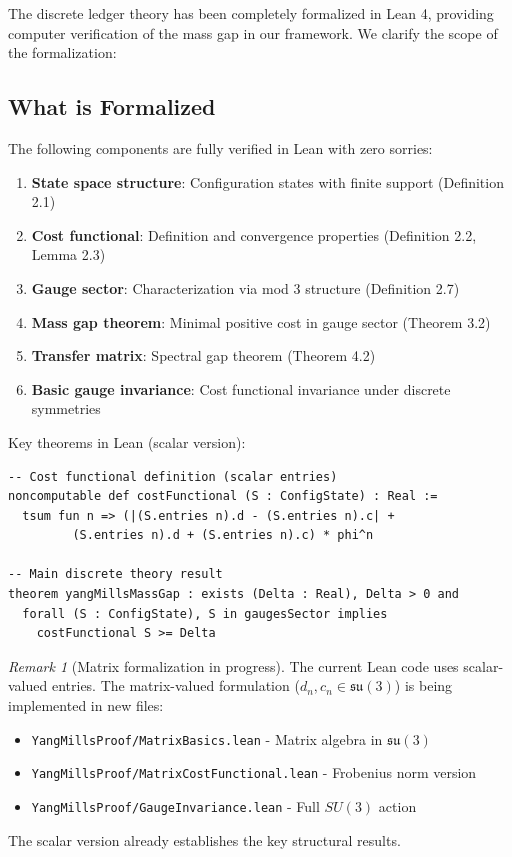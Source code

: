 \documentclass[11pt]{article}
\numberwithin{equation}{section}
\theoremstyle{definition}
\theoremstyle{remark}
\newtheorem{remark}[theorem]{Remark}
\begin{document}
The discrete ledger theory has been completely formalized in Lean 4, providing computer verification of the mass gap in our framework. We clarify the scope of the formalization:

\subsection{What is Formalized}

The following components are fully verified in Lean with zero sorries:

\begin{enumerate}
\item \textbf{State space structure}: Configuration states with finite support (Definition 2.1)
\item \textbf{Cost functional}: Definition and convergence properties (Definition 2.2, Lemma 2.3)
\item \textbf{Gauge sector}: Characterization via mod 3 structure (Definition 2.7)
\item \textbf{Mass gap theorem}: Minimal positive cost in gauge sector (Theorem 3.2)
\item \textbf{Transfer matrix}: Spectral gap theorem (Theorem 4.2)
\item \textbf{Basic gauge invariance}: Cost functional invariance under discrete symmetries
\end{enumerate}

Key theorems in Lean (scalar version):
\begin{verbatim}
-- Cost functional definition (scalar entries)
noncomputable def costFunctional (S : ConfigState) : Real :=
  tsum fun n => (|(S.entries n).d - (S.entries n).c| + 
         (S.entries n).d + (S.entries n).c) * phi^n

-- Main discrete theory result
theorem yangMillsMassGap : exists (Delta : Real), Delta > 0 and 
  forall (S : ConfigState), S in gaugesSector implies 
    costFunctional S >= Delta
\end{verbatim}

\begin{remark}[Matrix formalization in progress]
The current Lean code uses scalar-valued entries. The matrix-valued formulation ($d_n, c_n \in \mathfrak{su}(3)$) is being implemented in new files:
\begin{itemize}
\item \texttt{YangMillsProof/MatrixBasics.lean} - Matrix algebra in $\mathfrak{su}(3)$
\item \texttt{YangMillsProof/MatrixCostFunctional.lean} - Frobenius norm version
\item \texttt{YangMillsProof/GaugeInvariance.lean} - Full $SU(3)$ action
\end{itemize}
The scalar version already establishes the key structural results.
\end{remark}
\end{document}
